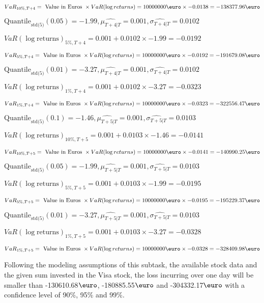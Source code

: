 $VaR_{10\%, T + 4} = \text{ Value in Euros } \times VaR(\log returns) = 10 000 000 \text{\euro} \times-0.0138 = -138377.96 \text{\euro}$


$\text{Quantile}_\text{std(5)}(0.05) = -1.99,\hat{\mu_{T+4|T}} = 0.001, \hat{\sigma_{T+4|T}} = 0.0102$

$VaR(\log \text{returns})_{5\%, T + 4} = 0.001 + 0.0102\times-1.99 = -0.0192$

$VaR_{5\%, T + 4} = \text{ Value in Euros } \times VaR(\log returns) = 10 000 000 \text{\euro} \times-0.0192 = -191679.08 \text{\euro}$


$\text{Quantile}_\text{std(5)}(0.01) = -3.27,\hat{\mu_{T+4|T}} = 0.001, \hat{\sigma_{T+4|T}} = 0.0102$

$VaR(\log \text{returns})_{1\%, T + 4} = 0.001 + 0.0102\times-3.27 = -0.0323$

$VaR_{1\%, T + 4} = \text{ Value in Euros } \times VaR(\log returns) = 10 000 000 \text{\euro} \times-0.0323 = -322556.47 \text{\euro}$


$\text{Quantile}_\text{std(5)}(0.1) = -1.46,\hat{\mu_{T+5|T}} = 0.001, \hat{\sigma_{T+5|T}} = 0.0103$

$VaR(\log \text{returns})_{10\%, T + 5} = 0.001 + 0.0103\times-1.46 = -0.0141$

$VaR_{10\%, T + 5} = \text{ Value in Euros } \times VaR(\log returns) = 10 000 000 \text{\euro} \times-0.0141 = -140990.25 \text{\euro}$


$\text{Quantile}_\text{std(5)}(0.05) = -1.99,\hat{\mu_{T+5|T}} = 0.001, \hat{\sigma_{T+5|T}} = 0.0103$

$VaR(\log \text{returns})_{5\%, T + 5} = 0.001 + 0.0103\times-1.99 = -0.0195$

$VaR_{5\%, T + 5} = \text{ Value in Euros } \times VaR(\log returns) = 10 000 000 \text{\euro} \times-0.0195 = -195229.37 \text{\euro}$


$\text{Quantile}_\text{std(5)}(0.01) = -3.27,\hat{\mu_{T+5|T}} = 0.001, \hat{\sigma_{T+5|T}} = 0.0103$

$VaR(\log \text{returns})_{1\%, T + 5} = 0.001 + 0.0103\times-3.27 = -0.0328$

$VaR_{1\%, T + 5} = \text{ Value in Euros } \times VaR(\log returns) = 10 000 000 \text{\euro} \times-0.0328 = -328409.98 \text{\euro}$


Following the modeling assumptions of this subtask, the available stock data and the given sum invested in the Visa stock, the loss incurring over one day will be smaller than -130610.68$\text{\euro}$, -180885.55$\text{\euro}$  and -304332.17$\text{\euro}$  with a confidence level of 90\%, 95\%  and 99\%.

